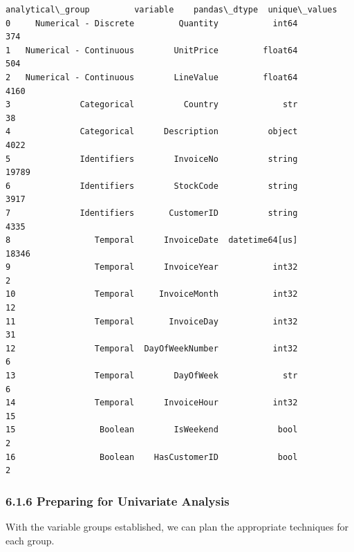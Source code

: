 \documentclass[11pt]{article}
\begin{document}
    
    \begin{Verbatim}[commandchars=\\\{\}]
          analytical\_group         variable    pandas\_dtype  unique\_values
0     Numerical - Discrete         Quantity           int64            374
1   Numerical - Continuous        UnitPrice         float64            504
2   Numerical - Continuous        LineValue         float64           4160
3              Categorical          Country             str             38
4              Categorical      Description          object           4022
5              Identifiers        InvoiceNo          string          19789
6              Identifiers        StockCode          string           3917
7              Identifiers       CustomerID          string           4335
8                 Temporal      InvoiceDate  datetime64[us]          18346
9                 Temporal      InvoiceYear           int32              2
10                Temporal     InvoiceMonth           int32             12
11                Temporal       InvoiceDay           int32             31
12                Temporal  DayOfWeekNumber           int32              6
13                Temporal        DayOfWeek             str              6
14                Temporal      InvoiceHour           int32             15
15                 Boolean        IsWeekend            bool              2
16                 Boolean    HasCustomerID            bool              2
    \end{Verbatim}

    
    \subsubsection{6.1.6 Preparing for Univariate
Analysis}\label{preparing-for-univariate-analysis}

With the variable groups established, we can plan the appropriate
techniques for each group.
\end{document}
